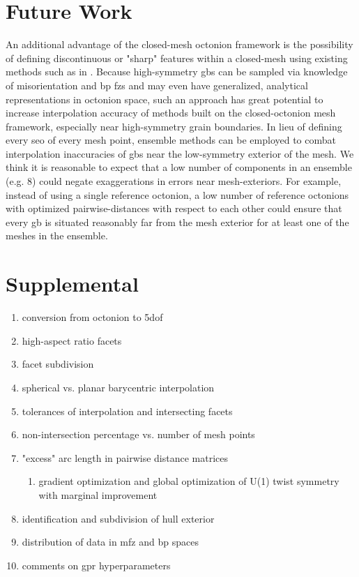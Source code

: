\documentclass[preprint,12pt]{elsarticle}
\begin{document}
\section{Future Work} \label{sec:future}
An additional advantage of the closed-mesh octonion framework is the possibility of defining discontinuous or "sharp" features within a closed-mesh using existing methods such as in \cite{tianNonUniformSubdivisionSurfaces2020}. Because high-symmetry \glspl{gb} can be sampled via knowledge of misorientation and \gls{bp} \glspl{fz} and may even have generalized, analytical representations in octonion space, such an approach has great potential to increase interpolation accuracy of methods built on the closed-octonion mesh framework, especially near high-symmetry grain boundaries. In lieu of defining every \gls{seo} of every mesh point, ensemble methods can be employed to combat interpolation inaccuracies of \glspl{gb} near the low-symmetry exterior of the mesh. We think it is reasonable to expect that a low number of components in an ensemble (e.g. 8) could negate exaggerations in errors near mesh-exteriors. For example, instead of using a single reference octonion, a low number of reference octonions with optimized pairwise-distances \cite{dolanBenchmarkingOptimizationSoftware2004,ConstrainedElectrostaticNonlinear2020} with respect to each other could ensure that every \gls{gb} is situated reasonably far from the mesh exterior for at least one of the meshes in the ensemble.


\section{Supplemental}
\begin{enumerate}
    \item conversion from octonion to \gls{5dof}
    \item high-aspect ratio facets
    \item facet subdivision
    \item spherical vs. planar barycentric interpolation
    \item tolerances of interpolation and intersecting facets
    \item non-intersection percentage vs. number of mesh points
    \item "excess" arc length in pairwise distance matrices
    \begin{enumerate}
        \item gradient optimization and global optimization of U(1) twist symmetry with marginal improvement
    \end{enumerate}
    \item identification and subdivision of hull exterior
    \item distribution of data in \gls{mfz} and \gls{bp} spaces
    \item comments on \gls{gpr} hyperparameters
\end{enumerate}

\newpage
\printglossaries

\newpage


\end{document}
